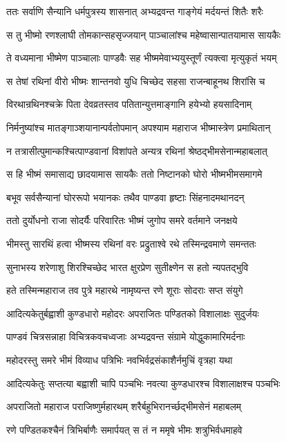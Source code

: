 \twolineshloka
{ततः सर्वाणि सैन्यानि धर्मपुत्रस्य शासनात्}
{अभ्यद्रवन्त गाङ्गेयं मर्दयन्तं शितैः शरैः}


\twolineshloka
{स तु भीष्मो रणश्लाघी तोमकान्सहसृज्जयान्}
{पाञ्चालांश्च महेष्वासान्पातयामास सायकैः}


\twolineshloka
{ते वध्यमाना भीष्मेण पाञ्चालाः पाण्डवैः सह}
{भीष्ममेवाभ्ययुस्तूर्णं त्यक्त्वा मृत्युकृतं भयम्}


\twolineshloka
{स तेषां रथिनां वीरो भीष्मः शान्तनवो युधि}
{चिच्छेद सहसा राजन्बाहूनथ शिरांसि च}


\twolineshloka
{विरथान्रथिनश्चक्रे पिता देवव्रतस्तव}
{पतितान्युत्तमाङ्गानि हयेभ्यो हयसादिनाम्}


\twolineshloka
{निर्मनुष्यांश्च मातङ्गाञ्शयानान्पर्वतोपमान्}
{अपश्याम महाराज भीष्मास्त्रेण प्रमाथितान्}


\twolineshloka
{न तत्रासीत्पुमान्कश्चित्पाण्डवानां विशांपते}
{अन्यत्र रथिनां श्रेष्ठद्भीमसेनान्महाबलात्}


\twolineshloka
{स हि भीष्मं समासाद्य छादयामास सायकैः}
{ततो निष्टानको घोरो भीष्मभीमसमागमे}


\twolineshloka
{बभूव सर्वसैन्यानां घोररूपो भयानकः}
{तथैव पाण्डवा हृष्टाः सिंहनादमथानदन्}


\twolineshloka
{ततो दुर्योधनो राजा सोदर्यैः परिवारितः}
{भीष्मं जुगोप समरे वर्तमाने जनक्षये}


\twolineshloka
{भीमस्तु सारथिं हत्वा भीष्मस्य रथिनां वरः}
{प्रद्रुताश्वे रथे तस्मिन्द्रवमाणे समन्ततः}


\twolineshloka
{सुनाभस्य शरेणाशु शिरश्चिच्छेद भारत}
{क्षुरप्रेण सुतीक्ष्णेन स हतो न्यपतद्भुवि}


\twolineshloka
{हते तस्मिन्महाराज तव पुत्रे महारथे}
{नामृष्यन्त रणे शूराः सोदराः सप्त संयुगे}


\twolineshloka
{आदित्यकेतुर्बह्वाशी कुण्डधारो महोदरः}
{अपराजितः पण्डितको विशालाक्षः सुदुर्जयः}


\twolineshloka
{पाण्डवं चित्रसन्नाहा विचित्रकवचध्वजाः}
{अभ्यद्रवन्त संग्रामे योद्धुकामारिमर्दनाः}


\twolineshloka
{महोदरस्तु समरे भीमं विव्याध पत्रिभिः}
{नवभिर्वद्रसंकाशैर्नमुचिं वृत्रहा यथा}


\twolineshloka
{आदित्यकेतुः सप्तत्या बह्वाशी चापि पञ्चभिः}
{नवत्या कुण्डधारश्च विशालाक्षश्च पञ्चभिः}


\twolineshloka
{अपराजितो महाराज पराजिष्णुर्महारथम्}
{शरैर्बहुभिरानर्च्छद्भीमसेनं महाबलम्}


\twolineshloka
{रणे पण्डितकश्चैनं त्रिभिर्बाणैः समार्पयत्}
{स तं न ममृषे भीमः शत्रुभिर्वधमाहवे}


